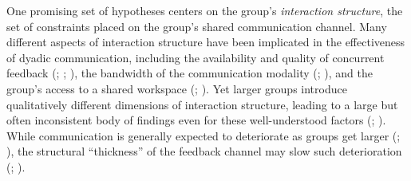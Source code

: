 \documentclass[
  english,
]{article}
\begin{document}
One promising set of hypotheses centers on the group's \emph{interaction structure}, the set of constraints placed on the group's shared communication channel.
Many different aspects of interaction structure have been implicated in the effectiveness of dyadic communication, including the availability and quality of concurrent feedback (; ; ), the bandwidth of the communication modality (; ), and the group's access to a shared workspace (; ).
Yet larger groups introduce qualitatively different dimensions of interaction structure, leading to a large but often inconsistent body of findings even for these well-understood factors (; ).
While communication is generally expected to deteriorate as groups get larger (; ), the structural ``thickness'' of the feedback channel may slow such deterioration (; ).
\end{document}
